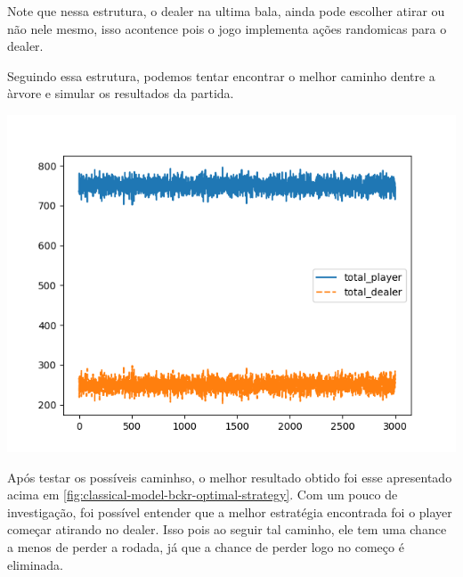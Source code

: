 \documentclass{article}
\begin{document}
Note que nessa estrutura, o dealer na ultima bala, ainda pode escolher atirar ou não nele mesmo, isso acontence pois o jogo implementa ações randomicas para o dealer.

Seguindo essa estrutura, podemos tentar encontrar o melhor caminho dentre a àrvore e simular os resultados da partida.


\begin{center}
	\includegraphics[scale=0.6]{optimal_player_strategy.png}
	\label{fig:classical-model-bckr-optimal-strategy}
\end{center}

Após testar os possíveis caminhso, o melhor resultado obtido foi esse apresentado acima em \ref{fig:classical-model-bckr-optimal-strategy}. Com um pouco de investigação, foi possível entender que a melhor estratégia encontrada foi o player começar atirando no dealer. Isso pois ao seguir tal caminho, ele tem uma chance a menos de perder a rodada, já que a chance de perder logo no começo é eliminada.
\end{document}

